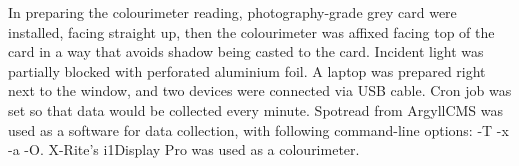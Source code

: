 In preparing the colourimeter reading, photography-grade grey card were installed, facing straight up, then the colourimeter was affixed facing top of the card in a way that avoids shadow being casted to the card. Incident light was partially blocked with perforated aluminium foil. A laptop was prepared right next to the window, and two devices were connected via USB cable. Cron job was set so that data would be collected every minute. Spotread from ArgyllCMS was used as a software for data collection, with following command-line options: -T -x -a -O. X-Rite's i1Display Pro was used as a colourimeter.
